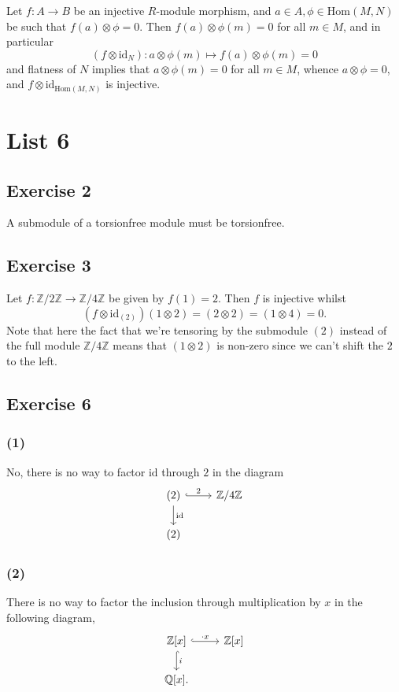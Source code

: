 \documentclass{article}
\theoremstyle{definition}
\newcommand{\Z}{\mathbb{Z}}
\newcommand{\Q}{\mathbb{Q}}
\newcommand{\Hom}{\text{Hom}}
\newcommand{\id}{\text{id}}
\begin{document}
Let $f : A \to B$ be an injective $R$-module morphism, and $a \in A, \phi \in
\Hom(M, N)$ be such that $f(a) \otimes \phi = 0$. Then $f(a) \otimes \phi(m) = 0$
for all $m \in M$, and in particular 
\[
	(f \otimes \id_N) : a \otimes \phi(m)
	\mapsto 
	f(a) \otimes \phi(m) = 0
\] 
and flatness of $N$ implies that $a \otimes \phi(m) = 0$ for all $m \in M$,
whence $a \otimes \phi = 0$, and $f \otimes \id_{\Hom(M, N)}$ is injective.

\section*{List 6}

\subsection*{Exercise 2}

A submodule of a torsionfree module must be torsionfree.

\subsection*{Exercise 3}

Let $f : \Z/2\Z \to \Z/4\Z$ be given by $f(1) = 2$. Then $f$ is injective
whilst
\[
	(f \otimes \id_{(2)})
	(1 \otimes 2)
	=
	(2 \otimes 2)
	=
	(1 \otimes 4)
	=
	0.
\] 
Note that here the fact that we're tensoring by the submodule $(2)$ instead of
the full module $\Z/4\Z$ means that $(1 \otimes 2)$ is non-zero since we can't
shift the $2$ to the left.

\subsection*{Exercise 6}
\subsubsection*{(1)}

No, there is no way to factor $\id$ through $2$ in the diagram
\[
\begin{tikzcd}
	(2) \ar[hook]{r}{2}\ar{d}{\id} & \Z/4\Z \\
	(2)
\end{tikzcd}
\] 

\subsubsection*{(2)}

There is no way to factor the inclusion through multiplication by $x$
in the following diagram,
\[
\begin{tikzcd}
	\Z[x] \ar[hook]{r}{\cdot x}\ar[hook]{d}{i} & \Z[x] \\
	\Q[x].
\end{tikzcd}
\]
\end{document}
